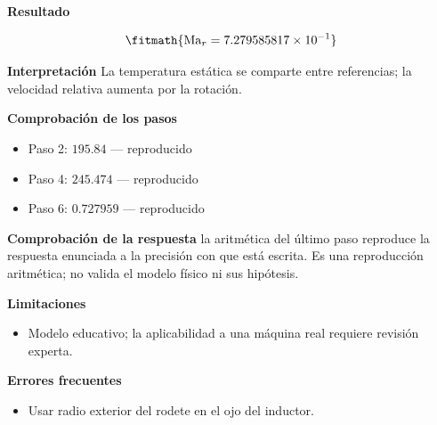 \documentclass[10pt,openany]{book}
\begin{document}
\begin{tcolorbox}[title={Problema resuelto 3}, studiumworked, breakable]
\noindent\textbf{Resultado}

\[
\fitmath{\mathrm{Ma}_r=7.279585817\times10^{-1}}
\]

\noindent\textbf{Interpretación}
La temperatura estática se comparte entre referencias; la velocidad relativa aumenta por la rotación.

\noindent\textbf{Comprobación de los pasos}
\begin{itemize}
\item Paso 2: $195.84$ — reproducido
\item Paso 4: $245.474$ — reproducido
\item Paso 6: $0.727959$ — reproducido
\end{itemize}

\noindent\textbf{Comprobación de la respuesta} la aritmética del último paso reproduce la respuesta enunciada a la precisión con que está escrita. Es una reproducción aritmética; no valida el modelo físico ni sus hipótesis.

\noindent\textbf{Limitaciones}
\begin{itemize}
\item Modelo educativo; la aplicabilidad a una máquina real requiere revisión experta.
\end{itemize}

\noindent\textbf{Errores frecuentes}
\begin{itemize}
\item Usar radio exterior del rodete en el ojo del inductor.
\end{itemize}
\end{tcolorbox}
\end{document}
